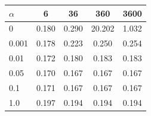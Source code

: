 \begin{tabular}{l c c c c}
\toprule
$\alpha$ & 6 & 36 & 360 & 3600 \\
\midrule
0 & 0.180 & 0.290 & 20.202 & 1.032 \\
0.001 & 0.178 & 0.223 & 0.250 & 0.254 \\
0.01 & 0.172 & 0.180 & 0.183 & 0.183 \\
0.05 & 0.170 & 0.167 & 0.167 & 0.167 \\
0.1 & 0.171 & 0.167 & 0.167 & 0.167 \\
1.0 & 0.197 & 0.194 & 0.194 & 0.194 \\
\bottomrule
\end{tabular}